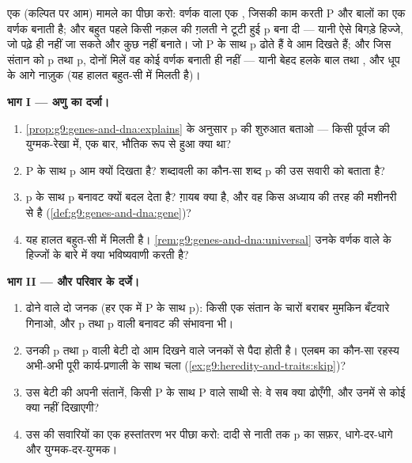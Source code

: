 \begin{problem}[{सप्ताहांत समस्या --- एक जीन का, हिज्जों से वंश-वृक्ष तक
पीछा}]\label{pb:g9:genes-and-dna:1}
एक (कल्पित पर आम) मामले का पीछा करो: वर्णक वाला एक , जिसकी काम करती
 P  और बालों का एक वर्णक बनाती है; और बहुत पहले किसी नक़ल की
ग़लती ने टूटी हुई  p बना दी --- यानी ऐसे बिगड़े हिज्जे, जो पढ़े ही
नहीं जा सकते और कुछ नहीं बनाते। जो P के साथ p ढोते हैं वे आम दिखते हैं;
और जिस संतान को p तथा p, दोनों मिलें वह कोई वर्णक बनाती ही नहीं --- यानी
बेहद हलके बाल तथा , और धूप के आगे नाज़ुक  (यह हालत बहुत-सी
 में मिलती है)।

\medskip\noindent\textbf{भाग I --- अणु का दर्जा।}
\begin{enumerate}
  \item \cref{prop:g9:genes-and-dna:explains} के अनुसार p की शुरुआत
        बताओ --- किसी पूर्वज की युग्मक-रेखा में, एक बार, भौतिक रूप से
        हुआ क्या था?
  \item P के साथ p आम क्यों दिखता है? शब्दावली का कौन-सा शब्द p की उस
        सवारी को बताता है?
  \item p के साथ p बनावट क्यों बदल देता है? ग़ायब क्या है, और वह किस
        अध्याय की तरह की मशीनरी से है
        (\cref{def:g9:genes-and-dna:gene})?
  \item यह हालत बहुत-सी  में मिलती है।
        \cref{rem:g9:genes-and-dna:universal} उनके वर्णक वाले  के
        हिज्जों के बारे में क्या भविष्यवाणी करती है?
\end{enumerate}

\medskip\noindent\textbf{भाग II ---  और परिवार के दर्जे।}
\begin{enumerate}[resume]
  \item ढोने वाले दो जनक (हर एक में P के साथ p): किसी एक संतान के
        चारों बराबर मुमकिन बँटवारे गिनाओ, और p तथा p वाली बनावट की
        संभावना भी।
  \item उनकी p तथा p वाली बेटी दो आम दिखने वाले जनकों से पैदा होती है।
        एलबम का कौन-सा रहस्य अभी-अभी पूरी कार्य-प्रणाली के साथ चला
        (\cref{ex:g9:heredity-and-traits:skip})?
  \item उस बेटी की अपनी संतानें, किसी P के साथ P वाले साथी से: वे सब
        क्या ढोएँगी, और उनमें से कोई क्या नहीं दिखाएगी?
  \item उस  की सवारियों का एक हस्तांतरण भर पीछा करो: दादी से
        नाती तक p का सफ़र, धागे-दर-धागे और युग्मक-दर-युग्मक।
\end{enumerate}


\end{problem}
